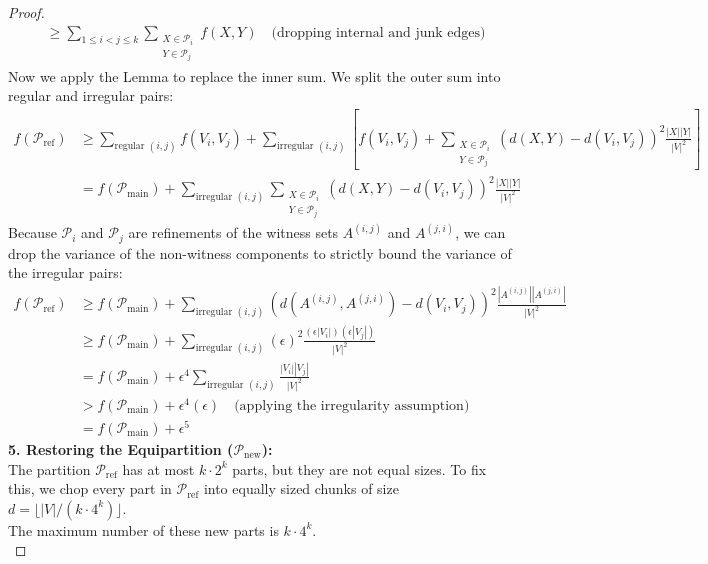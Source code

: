 \documentclass[a4paper]{article}
\begin{document}
\begin{proof}
\begin{align*}
        &\ge \sum_{1 \le i < j \le k} \sum_{\substack{X \in \mathcal{P}_i \\ Y \in \mathcal{P}_j}} f(X,Y) \quad \text{(dropping internal and junk edges)}
    \end{align*}
    Now we apply the Lemma to replace the inner sum. We split the outer sum into regular and irregular pairs:
    \begin{align*}
        f(\mathcal{P}_{\text{ref}}) &\ge \sum_{\text{regular } (i,j)} f(V_i, V_j) + \sum_{\text{irregular } (i,j)} \left[ f(V_i, V_j) + \sum_{\substack{X \in \mathcal{P}_i \\ Y \in \mathcal{P}_j}} (d(X,Y) - d(V_i, V_j))^2 \frac{|X||Y|}{|V|^2} \right] \\
        &= f(\mathcal{P}_{\text{main}}) + \sum_{\text{irregular } (i,j)} \sum_{\substack{X \in \mathcal{P}_i \\ Y \in \mathcal{P}_j}} (d(X,Y) - d(V_i, V_j))^2 \frac{|X||Y|}{|V|^2}
    \end{align*}
    Because $\mathcal{P}_i$ and $\mathcal{P}_j$ are refinements of the witness sets $A^{(i,j)}$ and $A^{(j,i)}$, we can drop the variance of the non-witness components to strictly bound the variance of the irregular pairs:
    \begin{align*}
        f(\mathcal{P}_{\text{ref}}) &\ge f(\mathcal{P}_{\text{main}}) + \sum_{\text{irregular } (i,j)} (d(A^{(i,j)}, A^{(j,i)}) - d(V_i, V_j))^2 \frac{|A^{(i,j)}||A^{(j,i)}|}{|V|^2} \\
        &\ge f(\mathcal{P}_{\text{main}}) + \sum_{\text{irregular } (i,j)} (\epsilon)^2 \frac{(\epsilon |V_i|)(\epsilon |V_j|)}{|V|^2} \\
        &= f(\mathcal{P}_{\text{main}}) + \epsilon^4 \sum_{\text{irregular } (i,j)} \frac{|V_i||V_j|}{|V|^2} \\
        &> f(\mathcal{P}_{\text{main}}) + \epsilon^4 (\epsilon) \quad \text{(applying the irregularity assumption)} \\
        &= f(\mathcal{P}_{\text{main}}) + \epsilon^5
    \end{align*}
    \textbf{5. Restoring the Equipartition ($\mathcal{P}_{\text{new}}$):} \\
    The partition $\mathcal{P}_{\text{ref}}$ has at most $k \cdot 2^k$ parts, but they are not equal sizes. To fix this, we chop every part in $\mathcal{P}_{\text{ref}}$ into equally sized chunks of size $d = \lfloor |V| / (k \cdot 4^k) \rfloor$. \\
    The maximum number of these new parts is $k \cdot 4^k$. \\

\end{proof}
\end{document}
